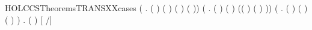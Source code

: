 \begin{SaveVerbatim}{HOLCCSTheoremsTRANSXXcases}
       (\HOLSymConst{\HOLTokenExists{}}    .
            ( \HOLSymConst{=}  \HOLSymConst{\ensuremath{\parallel}} ) \HOLSymConst{\HOLTokenConj{}} ( \HOLSymConst{=} \HOLConst{\ensuremath{\tau}}) \HOLSymConst{\HOLTokenConj{}} ( \HOLSymConst{=}  \HOLSymConst{\ensuremath{\parallel}} ) \HOLSymConst{\HOLTokenConj{}}
             \HOLTokenTransBegin{} \HOLTokenTransEnd {} \HOLSymConst{\HOLTokenConj{}}  \HOLTokenTransBegin{} ( )\HOLTokenTransEnd {}) \HOLSymConst{\HOLTokenDisj{}}
       (\HOLSymConst{\HOLTokenExists{}}   .
            ( \HOLSymConst{=} \HOLConst{\ensuremath{\nu}}  ) \HOLSymConst{\HOLTokenConj{}} ( \HOLSymConst{=} \HOLConst{\ensuremath{\nu}}  ) \HOLSymConst{\HOLTokenConj{}}  \HOLTokenTransBegin{}\HOLTokenTransEnd {} \HOLSymConst{\HOLTokenConj{}}
            (( \HOLSymConst{=} \HOLConst{\ensuremath{\tau}}) \HOLSymConst{\HOLTokenDisj{}} ( \HOLSymConst{=}  ) \HOLSymConst{\HOLTokenConj{}}  \HOLConst{\HOLTokenNotIn{}}  \HOLSymConst{\HOLTokenConj{}}   \HOLConst{\HOLTokenNotIn{}} )) \HOLSymConst{\HOLTokenDisj{}}
       (\HOLSymConst{\HOLTokenExists{}}   .
            ( \HOLSymConst{=}   ) \HOLSymConst{\HOLTokenConj{}} ( \HOLSymConst{=}   ) \HOLSymConst{\HOLTokenConj{}}
            ( \HOLSymConst{=}   ) \HOLSymConst{\HOLTokenConj{}}  \HOLTokenTransBegin{}\HOLTokenTransEnd {}) \HOLSymConst{\HOLTokenDisj{}}
       \HOLSymConst{\HOLTokenExists{}} . ( \HOLSymConst{=}   ) \HOLSymConst{\HOLTokenConj{}} [  /]  \HOLTokenTransBegin{}\HOLTokenTransEnd {}
\end{SaveVerbatim}
